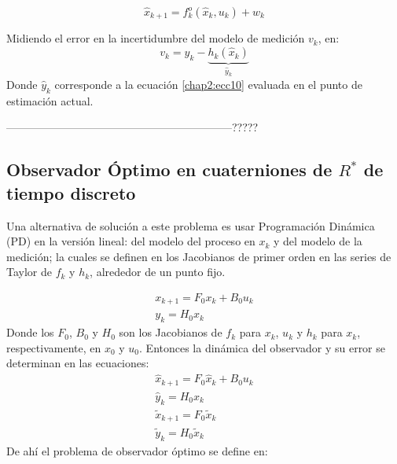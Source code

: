 \documentclass[conference]{IEEEtran}
\begin{document}
\begin{equation}
\label{chap2:ecc11}
\hat{x}_{k+1}=f^o_k(\hat{x}_k,u_k)+w_k
\end{equation}
\par
Midiendo el error en la incertidumbre del modelo de medición $v_k$, en:
\begin{equation}
\label{chap2:ecc4}
v_k=y_k-\underbrace{h_k(\hat{x}_k)}_{\hat{y}_k}
\end{equation}
Donde $\hat{y}_k$ corresponde a la ecuación \ref{chap2:ecc10} evaluada en el punto de estimación actual.\par
--------------------------------------------------------------?????
\subsection{Observador Óptimo en cuaterniones de $R^*$ de tiempo discreto}
Una alternativa de solución a este problema es usar Programación Dinámica (PD) \cite{Lewis2012} en la versión lineal: del modelo del proceso en $x_k$ y del modelo de la medición; la cuales se definen en los Jacobianos de primer orden en las series de Taylor de $f_k$ y $h_k$, alrededor de un punto fijo.\par
\begin{gather}
x_{k+1}=F_0x_k+B_0u_k\\
y_{k}=H_0x_k\label{chap2:MedicionLineal}
\end{gather}
Donde los $F_0$, $B_0$ y $H_0$ son los Jacobianos de $f_k$ para $x_k$, $u_k$ y $h_k$ para $x_k$, respectivamente, en $x_0$ y $u_0$. Entonces la dinámica del observador y su error se determinan en las ecuaciones:
\begin{gather}
\hat{x}_{k+1}=F_0\hat{x}_k+B_0u_k\\
\hat{y}_{k}=H_0\hat{x}_k\\
\tilde{x}_{k+1}=F_0\tilde{x}_k\\
\tilde{y}_{k}=H_0\tilde{x}_k
\end{gather}
De ahí el problema de observador óptimo se define en:
\end{document}
